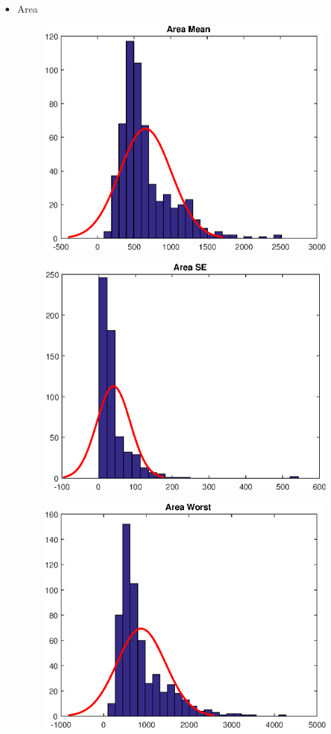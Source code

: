 \documentclass[11pt,a4paper]{article}
\numberwithin{equation}{section}
\begin{document}
\begin{itemize}
\item Area
\begin{figure}[H]
\centering
  \includegraphics[width=.5\linewidth]{./img/area_mean}
  \label{fig:test1}
\end{figure}%

\begin{figure}[H]
\centering
\begin{minipage}{.5\textwidth}
  \centering
  \includegraphics[width=\linewidth]{./img/area_se}
  \label{fig:test1}
\end{minipage}%
\begin{minipage}{.5\textwidth}
  \centering
  \includegraphics[width=\linewidth]{./img/area_worst}

\end{minipage}
\end{figure}
\end{itemize}
\end{document}
